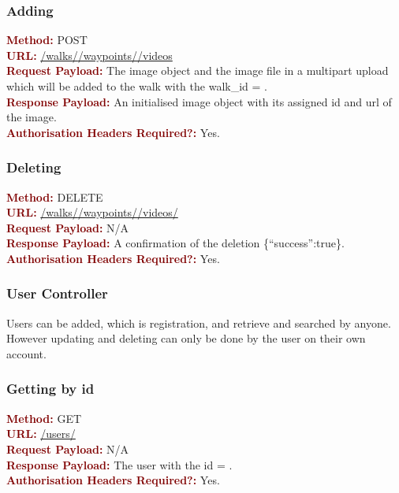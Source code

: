 \documentclass[11pt,a4paper]{report}
\begin{document}
\subsubsection{Adding}
\textbf{\textcolor{Maroon}{Method:}} POST\\
\textbf{\textcolor{Maroon}{URL:}} \url{/walks/}\url{/waypoints/}\url{/videos}\\
\textbf{\textcolor{Maroon}{Request Payload:}} The image object and the image file in a multipart upload which will be added to the walk with the walk\_id = .\\
\textbf{\textcolor{Maroon}{Response Payload:}} An initialised image object with its assigned id and url of the image.\\
\textbf{\textcolor{Maroon}{Authorisation Headers Required?:}} Yes.

\subsubsection{Deleting}
\textbf{\textcolor{Maroon}{Method:}} DELETE\\
\textbf{\textcolor{Maroon}{URL:}} \url{/walks/}\url{/waypoints/}\url{/videos/}\\
\textbf{\textcolor{Maroon}{Request Payload:}} N/A\\
\textbf{\textcolor{Maroon}{Response Payload:}} A confirmation of the deletion \{``success'':true\}.\\
\textbf{\textcolor{Maroon}{Authorisation Headers Required?:}} Yes.

\subsubsection{User Controller}
Users can be added, which is registration, and retrieve and searched by anyone. However updating and deleting can only be done by the user on their own account.

\subsubsection{Getting by id}
\textbf{\textcolor{Maroon}{Method:}} GET\\
\textbf{\textcolor{Maroon}{URL:}} \url{/users/}\\
\textbf{\textcolor{Maroon}{Request Payload:}} N/A\\
\textbf{\textcolor{Maroon}{Response Payload:}} The user with the id = .\\
\textbf{\textcolor{Maroon}{Authorisation Headers Required?:}} Yes.
\end{document}
